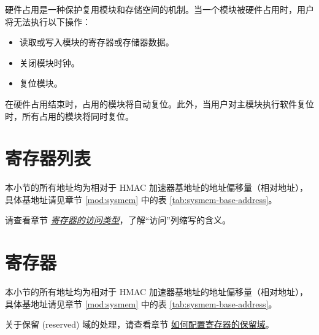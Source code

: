 \documentclass[main\_\_CN.tex]{subfiles}
\begin{document}
\begin{tiplisting}
硬件占用是一种保护复用模块和存储空间的机制。当一个模块被硬件占用时，用户将无法执行以下操作：
\vspace{-0.5em}
\begin{itemize}
    \item 读取或写入模块的寄存器或存储器数据。
    \item 关闭模块时钟。
    \item 复位模块。
\end{itemize}
\vspace{-0.5em}
在硬件占用结束时，占用的模块将自动复位。此外，当用户对主模块执行软件复位时，所有占用的模块将同时复位。
\end{tiplisting}



\clearpage
\newpage
\hypertarget{hmac-reg-summ}{}
\section{寄存器列表}
\label{sec:hmac-reg-summ}

本小节的所有地址均为相对于 HMAC 加速器基地址的地址偏移量（相对地址），具体基地址请见章节 \ref{mod:sysmem} \textit{} 中的表 \ref{tab:sysmem-base-address}。

请查看章节 \hyperref[glossary-access-types]{\textit{寄存器的访问类型}}，了解“访问”列缩写的含义。






\newpage
\section{寄存器}

本小节的所有地址均为相对于 HMAC 加速器基地址的地址偏移量（相对地址），具体基地址请见章节 \ref{mod:sysmem} \textit{} 中的表 \ref{tab:sysmem-base-address}。

关于保留 (reserved) 域的处理，请查看章节 \hyperref[programming-reserved-field]{如何配置寄存器的保留域}。


\end{document}
